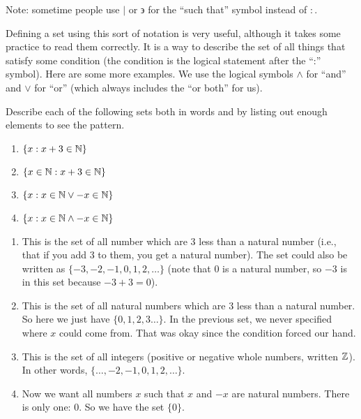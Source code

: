 \documentclass[12pt]{article}
\begin{document}
Note: sometime people use $|$ or $\backepsilon$ for the ``such that'' symbol instead of $:$.

Defining a set using this sort of notation is very useful, although it takes some practice to read them correctly.  It is a way to describe the set of all things that satisfy some condition (the condition is the logical statement after the ``:'' symbol).  Here are some more examples.  We use the logical symbols $\wedge$ for ``and'' and $\vee$ for ``or'' (which always includes the ``or both'' for us).  

\begin{example}
Describe each of the following sets both in words and by listing out enough elements to see the pattern.

\begin{enumerate}
\item $\{x : x + 3 \in \mathbb N\}$
\item $\{x \in \mathbb N : x + 3 \in \mathbb N\}$
\item $\{x : x \in \mathbb N \vee -x \in \mathbb N\}$
\item $\{x : x \in \mathbb N \wedge -x \in \mathbb N\}$
\end{enumerate}

\begin{solution}
\begin{enumerate}
\item This is the set of all number which are 3 less than a natural number (i.e., that if you add 3 to them, you get a natural number).  The set could also be written as $\{-3, -2, -1, 0, 1, 2, \ldots\}$ (note that 0 is a natural number, so $-3$ is in this set because $-3 + 3 = 0$).
\item This is the set of all natural numbers which are 3 less than a natural number.  So here we just have $\{0, 1, 2,3 \ldots\}$.  In the previous set, we never specified where $x$ could come from.  That was okay since the condition forced our hand.
\item This is the set of all integers (positive or negative whole numbers, written $\mathbb Z$).  In other words, $\{\ldots, -2, -1, 0, 1, 2, \ldots\}$.  
\item Now we want all numbers $x$ such that $x$ and $-x$ are natural numbers.  There is only one: 0.  So we have the set $\{0\}$.
\end{enumerate}
\end{solution}
\end{example}
\end{document}
